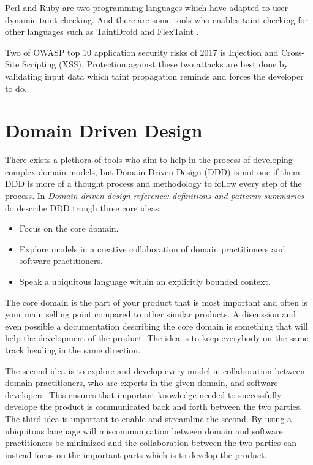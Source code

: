 Perl and Ruby are two programming languages which have adapted to user dynamic taint checking. \parencite{perl, ruby} And there are some tools who enables taint checking for other languages such as TaintDroid \parencite{Ma2010} and FlexTaint \parencite{Venkataramani2008}.

Two of OWASP top 10 application security risks of 2017 is Injection and Cross-Site Scripting (XSS). \parencite{OWASP2017} Protection against these two attacks are best done by validating input data which taint propagation reminds and forces the developer to do.


\section{Domain Driven Design}
There exists a plethora of tools who aim to help in the process of developing complex domain models, but Domain Driven Design (DDD) is not one if them. \parencite{Bankes, 10.1007/978-3-319-24309-2_33} DDD is more of a thought process and methodology to follow every step of the process. \parencite{EvansEric2004Dd:t} In \emph{Domain-driven design reference: definitions and patterns summaries} do \textcite{evans_2015} describe DDD trough three core ideas:

\begin{itemize}
  \item Focus on the core domain.
  \item Explore models in a creative collaboration of domain practitioners and software practitioners.
  \item Speak a ubiquitous language within an explicitly bounded context.
\end{itemize}

The core domain is the part of your product that is most important and often is your main selling point compared to other similar products. \parencite{millett_2015} A discussion and even possible a documentation describing the core domain is something that will help the development of the product. The idea is to keep everybody on the same track heading in the same direction. \parencite{EvansEric2004Dd:t}

The second idea is to explore and develop every model in collaboration between domain practitioners, who are experts in the given domain, and software developers. This ensures that important knowledge needed to successfully develope the product is communicated back and forth between the two parties. \parencite{millett_2015} The third idea is important to enable and streamline the second. By using a ubiquitous language will miscommunication between domain and software practitioners be minimized and the collaboration between the two parties can instead focus on the important parts which is to develop the product. \parencite{evans_2015}

